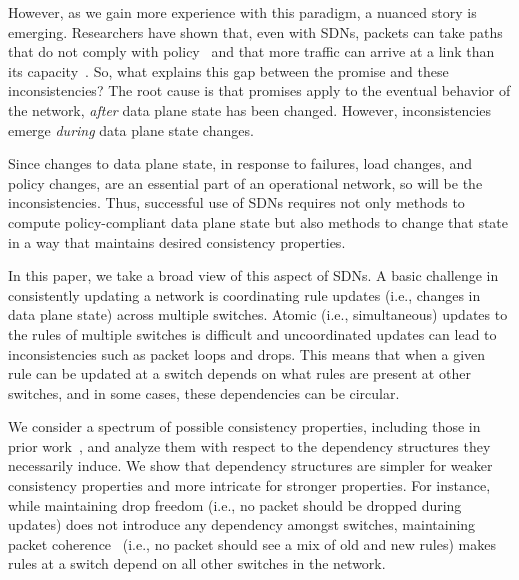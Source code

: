 However, as we gain more experience with this paradigm, a nuanced story is emerging.  Researchers have shown that, even with SDNs, packets can take paths that do not comply with policy~\cite{safeupdate} and that more traffic can arrive at a link than its capacity~\cite{swan}. So, what explains this gap between the promise and these inconsistencies? The root cause is that promises apply to the eventual behavior of the network, {\em after} data plane state has been changed. However, inconsistencies emerge {\em during} data plane state changes.

Since changes to data plane state, in response to failures, load changes, and policy changes, are an essential part of an operational network, so will be the inconsistencies. Thus, successful use of SDNs requires not only methods to compute policy-compliant data plane state but also methods to change that state in a way that maintains desired consistency properties.


In this paper, we take a broad view of this aspect of SDNs. A basic challenge in consistently updating a network is coordinating rule updates (i.e., changes in data plane state) across multiple switches.  Atomic (i.e., simultaneous) updates to the rules of multiple switches is difficult and uncoordinated updates can lead to inconsistencies such as packet loops and drops. This means that when a given rule can be updated at a switch depends on what rules are present at other switches, and in some cases, these dependencies can be circular.

We consider a spectrum of possible consistency properties, including those in prior work~\cite{safeupdate,swan}, and analyze them with respect to the dependency structures they necessarily induce.
We show that dependency structures are simpler for weaker consistency properties and more intricate for stronger properties.  For instance, while maintaining drop freedom (i.e., no packet should be dropped during updates) does not introduce any dependency amongst switches, maintaining packet coherence~\cite{safeupdate} (i.e., no packet should see a mix of old and new rules) makes rules at a switch depend on all other switches in the network.

